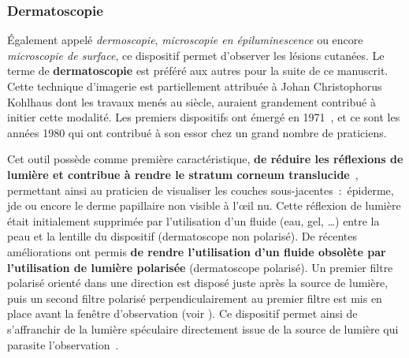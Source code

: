 \subsubsection{Dermatoscopie}
Également appelé \textit{dermoscopie}, \textit{microscopie en épiluminescence} ou encore \textit{microscopie de surface}, ce dispositif permet d’observer les lésions cutanées. Le terme de \textbf{dermatoscopie} est préféré aux autres pour la suite de ce manuscrit. Cette technique d’imagerie est partiellement attribuée à Johan Christophorus Kohlhaus dont les travaux menés au  siècle, auraient grandement contribué à initier cette modalité. Les premiers dispositifs ont émergé en 1971~\cite{MacKie1972}, et ce sont les années 1980 qui ont contribué à son essor chez un grand nombre de praticiens.\par

Cet outil possède comme première caractéristique, \textbf{de réduire les réflexions de lumière et contribue à rendre le stratum corneum translucide}~\cite{Katz2001}, permettant ainsi au praticien de visualiser les couches sous-jacentes~:~épiderme, \gls{jde} ou encore le derme papillaire non visible à l’œil nu. Cette réflexion de lumière était initialement supprimée par l’utilisation d’un fluide (eau, gel, \ldots) entre la peau et la lentille du dispositif (dermatoscope non polarisé). De récentes améliorations ont permis \textbf{de rendre l'utilisation d'un fluide obsolète par l'utilisation de lumière polarisée} (dermatoscope polarisé). Un premier filtre polarisé orienté dans une direction est disposé juste après la source de lumière, puis un second filtre polarisé perpendiculairement au premier filtre est mis en place avant la fenêtre d'observation (voir ). Ce dispositif permet ainsi de s'affranchir de la lumière spéculaire directement issue de la source de lumière qui parasite l'observation~\cite{Campos-do-Carmo2008}.\par

